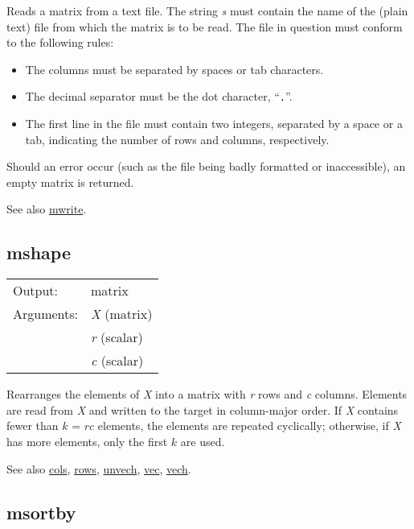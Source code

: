 	  Reads a matrix from a text file. The string \textsl{s}
	  must contain the name of the (plain text) file from which the
	  matrix is to be read. The file in question must conform to the
	  following rules:

\begin{itemize}
\item 
	      The columns must be separated by spaces or tab characters.

\item 
	      The decimal separator must be the dot character,
	      ``\texttt{.}''.

\item 
	      The first line in the file must contain two integers,
	      separated by a space or a tab, indicating the number of rows
	      and columns, respectively.

\end{itemize}

	  Should an error occur (such as the file being badly formatted or
	  inaccessible), an empty matrix is returned.

	  See also \hyperlink{func-mwrite}{mwrite}.

\subsection{mshape}
\hypertarget{func-mshape}{}

\begin{tabular}{ll}
Output:     & matrix\\
Arguments:  & \textsl{X} (matrix)\\
           & \textsl{r} (scalar)\\
           & \textsl{c} (scalar)\\
\end{tabular}

	  Rearranges the elements of \textsl{X} into a matrix
	  with \textsl{r} rows and \textsl{c} columns.
	  Elements are read from \textsl{X} and written to the
	  target in column-major order.  If \textsl{X} contains
	  fewer than \ensuremath{k} = \ensuremath{rc} elements, the
	  elements are repeated cyclically; otherwise, if
	  \textsl{X} has more elements, only the first
	  \ensuremath{k} are used.

	  See also \hyperlink{func-cols}{cols}, \hyperlink{func-rows}{rows}, \hyperlink{func-unvech}{unvech}, \hyperlink{func-vec}{vec}, \hyperlink{func-vech}{vech}.

\subsection{msortby}
\hypertarget{func-msortby}{}

